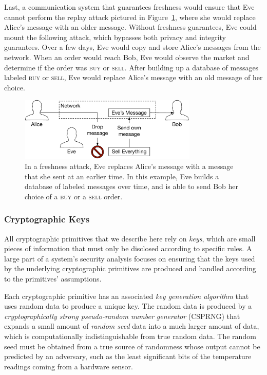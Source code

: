 Last, a communication system that guarantees freshness would ensure that Eve
cannot perform the replay attack pictured in Figure~\ref{fig:freshness_attack},
where she would replace Alice's message with an older message. Without
freshness guarantees, Eve could mount the following attack, which bypasses
both privacy and integrity guarantees. Over a few days, Eve would copy and
store Alice's messages from the network. When an order would reach Bob, Eve
would observe the market and determine if the order was \textsc{buy} or
\textsc{sell}. After building up a database of messages labeled \textsc{buy} or
\textsc{sell}, Eve would replace Alice's message with an old message of her
choice.

\begin{figure}[hbt]
  \centering
  \includegraphics[width=85mm]{figures/integrity_attack.pdf}
  \caption{
    In a freshness attack, Eve replaces Alice's message with a message that she
    sent at an earlier time. In this example, Eve builds a database of labeled
    messages over time, and is able to send Bob her choice of a \textsc{buy} or
    a \textsc{sell} order.
  }
  \label{fig:freshness_attack}
\end{figure}


\subsubsection{Cryptographic Keys}
\label{sec:crypto_keys}

All cryptographic primitives that we describe here rely on \textit{keys}, which
are small pieces of information that must only be disclosed according to
specific rules. A large part of a system's security analysis focuses on
ensuring that the keys used by the underlying cryptographic primitives are
produced and handled according to the primitives' assumptions.

Each cryptographic primitive has an associated \textit{key generation
algorithm} that uses random data to produce a unique key. The random data is
produced by a \textit{cryptographically strong pseudo-random number generator}
(CSPRNG) that expands a small amount of \textit{random seed} data into a much
larger amount of data, which is computationally indistinguishable from true
random data. The random seed must be obtained from a true source of randomness
whose output cannot be predicted by an adversary, such as the least significant
bits of the temperature readings coming from a hardware sensor.

